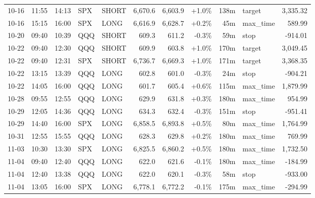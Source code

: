 \documentclass[11pt,a4paper,twoside]{article}
\begin{document}
\begin{center}
\begin{longtable}{>{\color{txtmain}}l l l l l r r r r >{\color{txtmain}}l r}
10-16 & 11:55 & 14:13 & SPX & SHORT & 6,670.6 & 6,603.9 & \textcolor{wingreen}{+1.0\%} & 138m & target & \textcolor{wingreen}{3,335.32} \\
10-16 & 15:15 & 16:00 & SPX & LONG & 6,616.9 & 6,628.7 & \textcolor{wingreen}{+0.2\%} & 45m & max\_time & \textcolor{wingreen}{589.99} \\
10-20 & 09:40 & 10:39 & QQQ & SHORT & 609.3 & 611.2 & \textcolor{lossred}{-0.3\%} & 59m & stop & \textcolor{lossred}{-914.01} \\
10-22 & 09:40 & 12:30 & QQQ & SHORT & 609.9 & 603.8 & \textcolor{wingreen}{+1.0\%} & 170m & target & \textcolor{wingreen}{3,049.45} \\
10-22 & 09:40 & 12:31 & SPX & SHORT & 6,736.7 & 6,669.3 & \textcolor{wingreen}{+1.0\%} & 171m & target & \textcolor{wingreen}{3,368.35} \\
10-22 & 13:15 & 13:39 & QQQ & LONG & 602.8 & 601.0 & \textcolor{lossred}{-0.3\%} & 24m & stop & \textcolor{lossred}{-904.21} \\
10-22 & 14:05 & 16:00 & QQQ & LONG & 601.7 & 605.4 & \textcolor{wingreen}{+0.6\%} & 115m & max\_time & \textcolor{wingreen}{1,879.99} \\
10-28 & 09:55 & 12:55 & QQQ & LONG & 629.9 & 631.8 & \textcolor{wingreen}{+0.3\%} & 180m & max\_time & \textcolor{wingreen}{954.99} \\
10-29 & 12:05 & 14:36 & QQQ & LONG & 634.3 & 632.4 & \textcolor{lossred}{-0.3\%} & 151m & stop & \textcolor{lossred}{-951.41} \\
10-29 & 14:40 & 16:00 & SPX & LONG & 6,858.5 & 6,893.8 & \textcolor{wingreen}{+0.5\%} & 80m & max\_time & \textcolor{wingreen}{1,764.99} \\
10-31 & 12:55 & 15:55 & QQQ & LONG & 628.3 & 629.8 & \textcolor{wingreen}{+0.2\%} & 180m & max\_time & \textcolor{wingreen}{769.99} \\
11-03 & 10:30 & 13:30 & SPX & LONG & 6,825.5 & 6,860.2 & \textcolor{wingreen}{+0.5\%} & 180m & max\_time & \textcolor{wingreen}{1,732.50} \\
11-04 & 09:40 & 12:40 & QQQ & LONG & 622.0 & 621.6 & \textcolor{lossred}{-0.1\%} & 180m & max\_time & \textcolor{lossred}{-184.99} \\
11-04 & 12:40 & 13:38 & QQQ & LONG & 622.0 & 620.1 & \textcolor{lossred}{-0.3\%} & 58m & stop & \textcolor{lossred}{-933.00} \\
11-04 & 13:05 & 16:00 & SPX & LONG & 6,778.1 & 6,772.2 & \textcolor{lossred}{-0.1\%} & 175m & max\_time & \textcolor{lossred}{-294.99} \\

\end{longtable}
\end{center}
\end{document}
